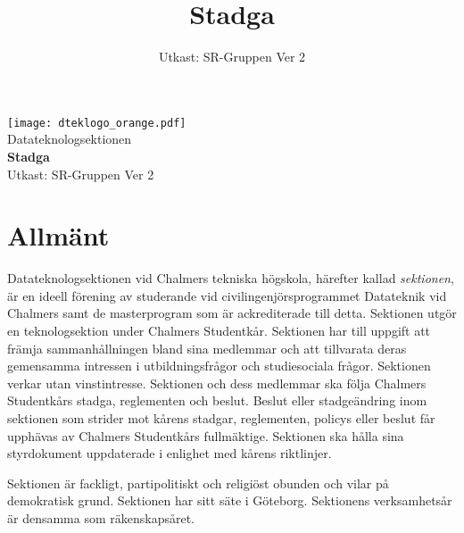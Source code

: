 \documentclass[a4paper]{dteklag}
\title{Stadga}
\date{Utkast: SR-Gruppen Ver 2}
\begin{document}
\begin{titlepage}
  \thispagestyle{empty} %
  \vspace*{1cm}
  \begin{center}
    \texttt{[image: dteklogo\_orange.pdf]}\\[3em]
    {\Huge Datateknologsektionen}\\[3em]
    {\Huge \textbf{Stadga}}\\[1em]
    Utkast: SR-Gruppen Ver 2
  \end{center}
\end{titlepage}

\makeheadfoot

\setcounter{tocdepth}{2}
\tableofcontents

\section{Allmänt}
\para[Ändamål] Datateknologsektionen vid Chalmers tekniska högskola, härefter kallad \textit{sektionen}, är en ideell förening av studerande vid civilingenjörsprogrammet Datateknik vid Chalmers samt de masterprogram som är ackrediterade till detta. Sektionen utgör en teknologsektion under Chalmers Studentkår. 
\para Sektionen har till uppgift att främja sammanhållningen bland sina medlemmar och att tillvarata deras gemensamma intressen i utbildningsfrågor och studiesociala frågor. Sektionen verkar utan vinstintresse.
\para Sektionen och dess medlemmar ska följa Chalmers Studentkårs stadga, reglementen och beslut. Beslut eller stadgeändring inom sektionen som strider mot kårens stadgar, reglementen, policys eller beslut får upphävas av Chalmers Studentkårs fullmäktige. Sektionen ska hålla sina styrdokument uppdaterade i enlighet med kårens riktlinjer. 

\para Sektionen är fackligt, partipolitiskt och religiöst obunden och vilar på demokratisk grund.
\para Sektionen har sitt säte i Göteborg.
\para Sektionens verksamhetsår är densamma som räkenskapsåret.


\end{document}
